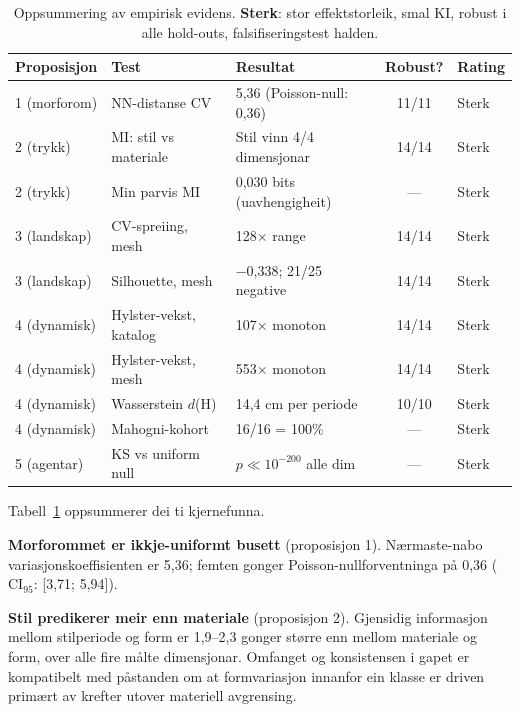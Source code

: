 \begin{table}[!t]
\centering
\caption{Oppsummering av empirisk evidens. \textbf{Sterk}: stor effektstorleik, smal KI, robust i alle hold-outs, falsifiseringstest halden.}
\label{tab:evidence}
\small
\begin{tabularx}{\textwidth}{@{} >{\raggedright}p{} >{\raggedright}p{} >{\raggedright}p{} c >{\raggedright\arraybackslash}p{} @{}}
\toprule
\textbf{Proposisjon} & \textbf{Test} & \textbf{Resultat} & \textbf{Robust?} & \textbf{Rating} \\
\midrule
1 (morforom) & NN-distanse CV & 5,36 (Poisson-null: 0,36) & 11/11 & Sterk \\[2pt]
2 (trykk) & MI: stil vs materiale & Stil vinn 4/4 dimensjonar & 14/14 & Sterk \\[2pt]
2 (trykk) & Min parvis MI & 0,030 bits (uavhengigheit) & --- & Sterk \\[2pt]
3 (landskap) & CV-spreiing, mesh & 128$\times$ range & 14/14 & Sterk \\[2pt]
3 (landskap) & Silhouette, mesh & $-$0,338; 21/25 negative & 14/14 & Sterk \\[2pt]
4 (dynamisk) & Hylster-vekst, katalog & 107$\times$ monoton & 14/14 & Sterk \\[2pt]
4 (dynamisk) & Hylster-vekst, mesh & 553$\times$ monoton & 14/14 & Sterk \\[2pt]
4 (dynamisk) & Wasserstein $d$(H) & 14,4 cm per periode & 10/10 & Sterk \\[2pt]
4 (dynamisk) & Mahogni-kohort & 16/16 = 100\% & --- & Sterk \\[2pt]
5 (agentar) & KS vs uniform null & $p \ll 10^{-200}$ alle dim & --- & Sterk \\
\bottomrule
\end{tabularx}
\end{table}

Tabell~\ref{tab:evidence} oppsummerer dei ti kjernefunna.

\textbf{Morforommet er ikkje-uniformt busett} (proposisjon 1). Nærmaste-nabo variasjonskoeffisienten er 5,36; femten gonger Poisson-nullforventninga på 0,36 ($\mathrm{CI}_{95}$: [3,71; 5,94]).

\textbf{Stil predikerer meir enn materiale} (proposisjon 2). Gjensidig informasjon mellom stilperiode og form er 1,9--2,3 gonger større enn mellom materiale og form, over alle fire målte dimensjonar. Omfanget og konsistensen i gapet er kompatibelt med påstanden om at formvariasjon innanfor ein klasse er driven primært av krefter utover materiell avgrensing.

